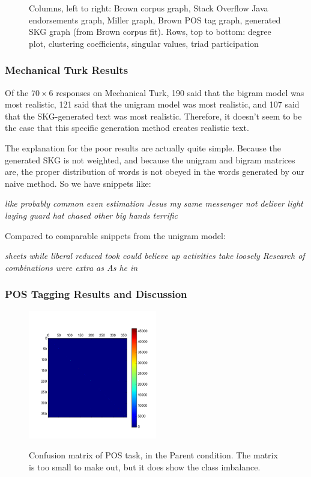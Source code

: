 \documentclass[12pt]{article}
\begin{document}
\begin{figure}
  \caption{Columns, left to right: Brown corpus graph, Stack Overflow Java endorsements graph, Miller graph, Brown POS tag graph, generated SKG graph (from Brown corpus fit). Rows, top to bottom: degree plot, clustering coefficients, singular values, triad participation}
\end{figure}

\subsubsection*{Mechanical Turk Results}

Of the $70 \times 6$ responses on Mechanical Turk, 190 said that the bigram model was most realistic, 121 said that the unigram model was most realistic, and 107 said that the SKG-generated text was most realistic. Therefore, it doesn't seem to be the case that this specific generation method creates realistic text.

The explanation for the poor results are actually quite simple. Because the generated SKG is not weighted, and because the unigram and bigram matrices are, the proper distribution of words is not obeyed in the words generated by our naive method. So we have snippets like:

\emph{like probably common even estimation Jesus my same messenger not}
\emph{deliver light laying guard hat chased other big hands terrific}

Compared to comparable snippets from the unigram model:

\emph{sheets while liberal reduced took could believe up activities take}
\emph{loosely Research of combinations were extra as As he in}

\subsubsection*{POS Tagging Results and Discussion}

\begin{figure}
  \includegraphics[width=0.50\textwidth]{kron_conf_mat}
  \label{fig:confmat}
  \caption{Confusion matrix of POS task, in the Parent condition. The matrix is too small to make out, but it does show the class imbalance.}
\end{figure}
\end{document}

